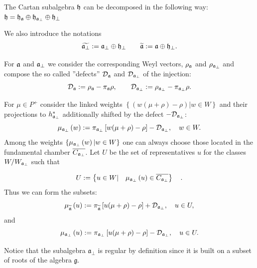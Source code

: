 The Cartan subalgebra $\frak{h}$ can be decomposed in the following way:  $\frak{h}=\frak{\frak{h}_{\mathfrak{a}}}\oplus
\frak{h}_{\mathfrak{a}_{\bot}}\oplus \frak{h}_{\perp }$

We also introduce the notations
\begin{eqnarray}
\widetilde{\frak{a}_{\perp }} :=\frak{a}_{\perp }\oplus \frak{h}_{\perp }
\qquad
\widetilde{\frak{a}} :=\frak{a}\oplus \frak{h}_{\perp }.
\end{eqnarray}

For $\mathfrak{a}$ and $\mathfrak{a}_{\bot}$ we consider the
corresponding Weyl vectors, $\rho _{\mathfrak{a}}$ and $\rho _{\mathfrak{a}_{\perp
}} $ and compose the so called ''defects'' $\mathcal{D}_{\mathfrak{a}}$ and $\mathcal{%
D}_{\afb}$ of the injection:
\begin{equation}
\mathcal{D}_{\af}:=\rho _{\af}-\pi _{\af}\rho , \qquad
\mathcal{D}_{\afb}:=\rho _{\afb}-\pi _{\af%
_{\perp }}\rho .  \label{defect-ort}
\end{equation}

For $\mu \in P^{+}$ consider the linked weights $\left\{ \left(
w(\mu +\rho )-\rho \right) |w\in W\right\} $ and their projections
to
$h_{\mathfrak{a}_{\bot}}^{\ast }$ additionally shifted by the defect $-%
\mathcal{D}_{\afb}$:
\begin{equation*}
\mu _{\mathfrak{a}_{\bot}}\left( w\right) :=\pi _{\mathfrak{a}_{\bot}}\left[
w(\mu +\rho )-\rho \right] -\mathcal{D}_{\mathfrak{a}_{\bot}},\quad w\in W.
\end{equation*}
Among the weights $\left\{ \mu _{\mathfrak{a}_{\perp
}}\left( w\right) |w\in W\right\} $ one can always choose those located in
the fundamental chamber $\overline{C_{\mathfrak{a}_{\bot}}}$. Let $U$ be the
set of representatives $u$ for the classes $W/W_{\mathfrak{a}_{\bot}}$ such
that

\begin{equation}
U:=\left\{ u\in W|\quad \mu _{\mathfrak{a}_{\bot}}\left( u\right) \in
\overline{C_{\mathfrak{a}_{\bot}}}\right\} \quad .  \label{U-def}
\end{equation}
Thus we can form the subsets:
\begin{equation}
\mu _{\widetilde{\mathfrak{a}}}\left( u\right) :=\pi _{\widetilde{%
\mathfrak{a}}}\left[ u(\mu +\rho )-\rho \right] +\mathcal{D}_{\af%
_{\perp }},\quad u\in U,  \label{mu-a}
\end{equation}
and
\begin{equation}
\mu _{\mathfrak{a}_{\bot}}\left( u\right) :=\pi _{\mathfrak{a}_{\bot}}\left[
u(\mu +\rho )-\rho \right] -\mathcal{D}_{\mathfrak{a}_{\bot}},\quad u\in U.
\label{mu-a-tilda}
\end{equation}

Notice that the subalgebra $\mathfrak{a}_{\bot}$ is regular by definition
since it is built on a subset of roots of the algebra $\mathfrak{g}$.

